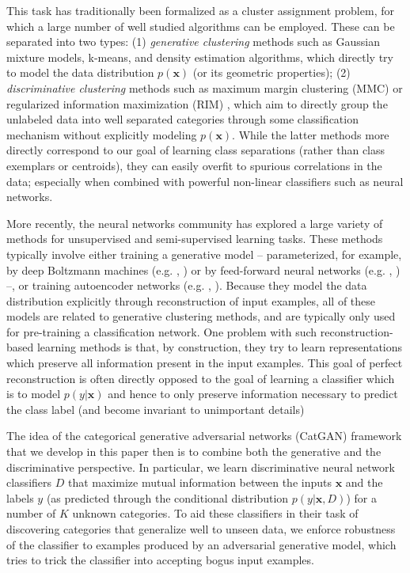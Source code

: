\documentclass{article} \usepackage{iclr2016_conference,times}
\newcommand{\bx}{\mathbf{x}}
\begin{document}
This task has traditionally been formalized as a cluster assignment
problem, for which a large number of well studied algorithms can be
employed. These can be separated into two types: (1)
\emph{generative clustering} methods such as Gaussian mixture models,
k-means, and density estimation algorithms, which directly try to model
the data distribution $p(\bx)$ (or its geometric properties); (2)
\emph{discriminative clustering} methods such as maximum margin
clustering (MMC) \citep{MMC_2004} or regularized information
maximization (RIM) \citep{Krause_2010}, which aim to directly group
the unlabeled data into well separated categories through some
classification mechanism without explicitly modeling $p(\bx)$. While
the latter methods more directly correspond to our goal of learning
class separations (rather than class exemplars or centroids), they can
easily overfit to spurious correlations in the data; especially when
combined with powerful non-linear classifiers such as neural networks.

More recently, the neural networks community has explored a large
variety of methods for unsupervised and semi-supervised learning
tasks. These methods typically involve either training a generative
model -- parameterized, for example, by deep Boltzmann machines
(e.g. \citet{SalHinton07}, \citet{Goodfellow_NIPS2013}) or by
feed-forward neural networks (e.g. \citet{Bengio_ICML2014},
\citet{Kingma_NIPS2014}) --, or training autoencoder networks
(e.g. \citet{HintonSalakhutdinov2006b},
\citet{VincentPLarochelleH2008}). Because they model the data
distribution explicitly through reconstruction of input examples, all
of these models are related to generative clustering methods, and are
typically only used for pre-training a classification network.  One
problem with such reconstruction-based learning methods is that, by
construction, they try to learn representations which preserve all
information present in the input examples. This goal of perfect
reconstruction is often directly opposed to the goal of learning a
classifier which is to model $p(y | \bx)$ and hence to only preserve
information necessary to predict the class label (and become invariant
to unimportant details)

The idea of the categorical generative adversarial networks (CatGAN)
framework that we develop in this paper then is to combine both the
generative and the discriminative perspective. In particular, we learn
discriminative neural network classifiers $D$ that maximize mutual
information between the inputs $\bx$ and the labels $y$ (as predicted
through the conditional distribution $p(y | \bx, D)$) for a number
of $K$ unknown categories. To aid these classifiers in their task of
discovering categories that generalize well to unseen data, we enforce
robustness of the classifier to examples produced by an adversarial
generative model, which tries to trick the classifier into accepting
bogus input examples.
\end{document}
